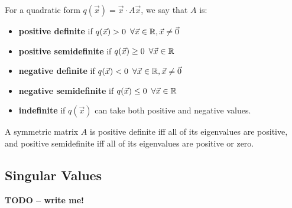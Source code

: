 \documentclass[]{scrartcl}
\begin{document}
	For a quadratic form $q(\vec{x}) = \vec{x} \cdot A\vec{x}$, we say that $A$ is:
	\begin{itemize}
		\item \textbf{positive definite} if $q(\vec{x}) > 0 \enskip \forall \vec{x} \in \mathbb{R}, \vec{x} \neq \vec{0}$
		\item \textbf{positive semidefinite} if $q(\vec{x}) \geq 0 \enskip \forall \vec{x} \in \mathbb{R}$
		\item \textbf{negative definite} if $q(\vec{x}) < 0 \enskip \forall \vec{x} \in \mathbb{R}, \vec{x} \neq \vec{0}$
		\item \textbf{negative semidefinite} if $q(\vec{x}) \leq 0 \enskip \forall \vec{x} \in \mathbb{R}$
		\item \textbf{indefinite} if $q(\vec{x})$ can take both positive and negative values.
	\end{itemize}

	A symmetric matrix $A$ is positive definite iff all of its eigenvalues are positive, and positive semidefinite iff all of its eigenvalues are positive or zero.\\
	
	\subsection{Singular Values}
	\textbf{TODO -- write me!}
	
\end{document}
